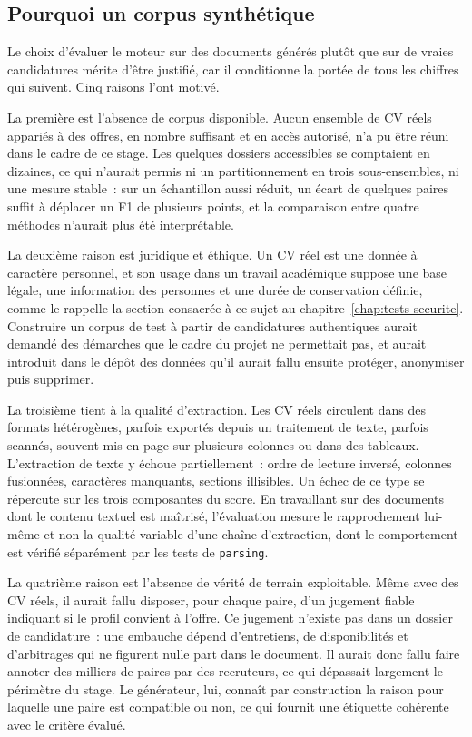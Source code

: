 \subsection{Pourquoi un corpus synthétique}

Le choix d'évaluer le moteur sur des documents générés plutôt que sur de vraies candidatures mérite d'être justifié, car il conditionne la portée de tous les chiffres qui suivent. Cinq raisons l'ont motivé.

La première est l'absence de corpus disponible. Aucun ensemble de CV réels appariés à des offres, en nombre suffisant et en accès autorisé, n'a pu être réuni dans le cadre de ce stage. Les quelques dossiers accessibles se comptaient en dizaines, ce qui n'aurait permis ni un partitionnement en trois sous-ensembles, ni une mesure stable~: sur un échantillon aussi réduit, un écart de quelques paires suffit à déplacer un F1 de plusieurs points, et la comparaison entre quatre méthodes n'aurait plus été interprétable.

La deuxième raison est juridique et éthique. Un CV réel est une donnée à caractère personnel, et son usage dans un travail académique suppose une base légale, une information des personnes et une durée de conservation définie, comme le rappelle la section consacrée à ce sujet au chapitre~\ref{chap:tests-securite}. Construire un corpus de test à partir de candidatures authentiques aurait demandé des démarches que le cadre du projet ne permettait pas, et aurait introduit dans le dépôt des données qu'il aurait fallu ensuite protéger, anonymiser puis supprimer.

La troisième tient à la qualité d'extraction. Les CV réels circulent dans des formats hétérogènes, parfois exportés depuis un traitement de texte, parfois scannés, souvent mis en page sur plusieurs colonnes ou dans des tableaux. L'extraction de texte y échoue partiellement~: ordre de lecture inversé, colonnes fusionnées, caractères manquants, sections illisibles. Un échec de ce type se répercute sur les trois composantes du score. En travaillant sur des documents dont le contenu textuel est maîtrisé, l'évaluation mesure le rapprochement lui-même et non la qualité variable d'une chaîne d'extraction, dont le comportement est vérifié séparément par les tests de \texttt{parsing}.

La quatrième raison est l'absence de vérité de terrain exploitable. Même avec des CV réels, il aurait fallu disposer, pour chaque paire, d'un jugement fiable indiquant si le profil convient à l'offre. Ce jugement n'existe pas dans un dossier de candidature~: une embauche dépend d'entretiens, de disponibilités et d'arbitrages qui ne figurent nulle part dans le document. Il aurait donc fallu faire annoter des milliers de paires par des recruteurs, ce qui dépassait largement le périmètre du stage. Le générateur, lui, connaît par construction la raison pour laquelle une paire est compatible ou non, ce qui fournit une étiquette cohérente avec le critère évalué.

